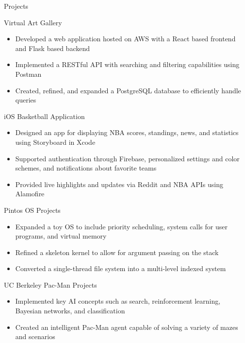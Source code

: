 \documentclass[]{mcdowellcv}
\begin{document}
	\begin{cvsection}{Projects}
		\begin{cvsubsection}{Virtual Art Gallery}{}{}
			\begin{itemize}
				\item Developed a web application hosted on AWS with a React based frontend and Flask based backend
				\item Implemented a RESTful API with searching and filtering capabilities using Postman
				\item Created, refined, and expanded a PostgreSQL database to efficiently handle queries
			\end{itemize}
		\end{cvsubsection}

		\begin{cvsubsection}{iOS Basketball Application}{}{}
			\begin{itemize}
				\item Designed an app for displaying NBA scores, standings, news, and statistics using Storyboard in Xcode
				\item Supported authentication through Firebase, personalized settings and color schemes, and notifications about favorite teams
				\item Provided live highlights and updates via Reddit and NBA APIs using Alamofire
			\end{itemize}
		\end{cvsubsection}

		\begin{cvsubsection}{Pintos OS Projects}{}{}
			\begin{itemize}
				\item Expanded a toy OS to include priority scheduling, system calls for user programs, and virtual memory
				\item Refined a skeleton kernel to allow for argument passing on the stack
				\item Converted a single-thread file system into a multi-level indexed system
			\end{itemize}
		\end{cvsubsection}

		\begin{cvsubsection}{UC Berkeley Pac-Man Projects}{}{}
			\begin{itemize}
				\item Implemented key AI concepts such as search, reinforcement learning, Bayesian networks, and classification
				\item Created an intelligent Pac-Man agent capable of solving a variety of mazes and scenarios
			\end{itemize}
		\end{cvsubsection}
	\end{cvsection}
	
\end{document}
